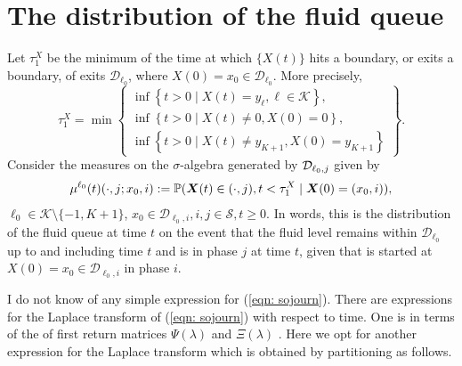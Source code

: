 \section{The distribution of the fluid queue}\label{sec: no change}
Let \(\tau_1^X\) be the minimum of the time at which \(\{X(t)\}\) hits a boundary, or exits a boundary, of exits \(\mathcal D_{\ell_0}\), where \(X(0)=x_0\in\mathcal D_{\ell_0}\). More precisely, 
\[\tau_1^X = \min\left\{\begin{array}{c}\inf\left\{t>0\mid X(t)=y_{\ell}, \ell\in\mathcal K\right\}, \\ \inf\left\{t>0 \mid X(t) \neq 0, X(0)=0\right\}, \\ \inf\left\{t>0 \mid X(t) \neq y_{K+1}, X(0)=y_{K+1}\right\} \end{array} \right\}.\]
Consider the measures on the \(\sigma\)-algebra generated by \(\mathcal{D}_{\ell_0,j}\) given by
\begin{align}\label{eqn: sojourn}
	\mu^{\ell_0}(t)(\cdot,j; x_0,i) := \mathbb P(\boldsymbol X(t)\in (\cdot ,j), t<\tau_1^X \mid \boldsymbol X(0) = (x_0, i)),
\end{align}
\(\ell_0\in\mathcal K\setminus\{-1,K+1\}\), \(x_0 \in\mathcal D_{\ell_0,i}, i,j\in\mathcal S, t \geq 0. \)
In words, this is the distribution of the fluid queue at time \(t\) on the event that the fluid level remains within \(\mathcal D_{\ell_0}\) up to and including time \(t\) and is in phase \(j\) at time \(t\), given that is started at \(X(0)=x_0\in\mathcal D_{\ell_0,i}\) in phase \(i\). 

I do not know of any simple expression for (\ref{eqn: sojourn}). There are expressions for the Laplace transform of (\ref{eqn: sojourn}) with respect to time. One is in terms of the of first return matrices \(\Psi(\lambda)\) and \(\Xi(\lambda)\) \citep{bean2009}. Here we opt for another expression for the Laplace transform which is obtained by partitioning as follows.

